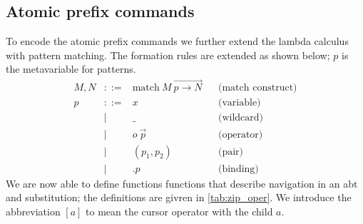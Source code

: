 \documentclass[sigplan,review]{acmart}
\newcommand{\abt}{\textsf{abt}\xspace}
\begin{document}

\subsection{Atomic prefix commands}

To encode the atomic prefix commands we further extend the lambda
calculus with pattern matching. The formation rules are extended as
shown below; $p$ is the metavariable for patterns.
\begin{align*}
    M, N & ::= & \text{match}\ M\ \overrightarrow{p \to N} && \text{(match construct)}
    \\
    p & ::= & x              & & \text{(variable)} \\
      & |   & \_             && \text{(wildcard)} \\
      & |   & o\ \Vec{p}     && \text{(operator)} \\
      & |   & (p_1, p_2)     && \text{(pair)} \\
         & |   & .p             && \text{(binding)}
\end{align*}
%
We are now able to define functions functions that describe navigation
in an \abt and substitution; the definitions are givren in
\cref{tab:zip_oper}. We introduce the abbreviation $[a]$ to mean the
cursor operator with the child $a$.
\end{document}
